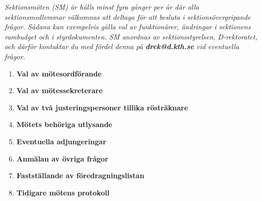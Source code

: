 \documentclass{protokoll}
\begin{document}
{\small \textit{Sektionsmöten (SM) är hålls minst fyra gånger per år där alla sektionsmedlemmar välkomnas att deltaga för att besluta i sektionsövergripande frågor. Sådana kan exempelvis gälla val av funktionärer, ändringar i sektionens rambudget och i styrdokumenten. SM anordnas av sektionsstyrelsen, D-rektoratet, och därför kontaktar du med fördel denna på \textbf{\textit{drek@d.kth.se}} vid eventuella frågor.}} %

\begin{motesfakta} %
  \narvarande
\end{motesfakta}






  \begin{enumerate}
    \item\textbf{Val av mötesordförande}
    \item\textbf{Val av mötessekreterare}
    \item\textbf{Val av två justeringspersoner tillika rösträknare}
    \item\textbf{Mötets behöriga utlysande}
    \item\textbf{Eventuella adjungeringar}
    \item\textbf{Anmälan av övriga frågor}
    \item\textbf{Fastställande av föredragningslistan}
    \item\textbf{Tidigare mötens protokoll}
  \end{enumerate}
\end{document}
